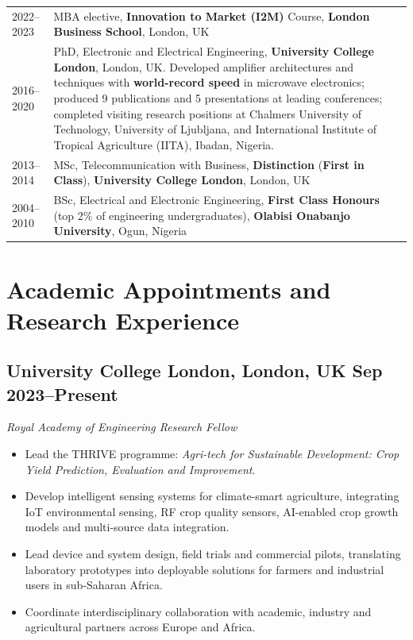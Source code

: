 \documentclass[a4paper,11pt]{article}
\newcommand{\cvitem}[2]{%
    \textsc{#1} & #2\\[2.5mm]
}
\newcommand{\role}[3]{%
    \subsection*{#1 \hfill \normalfont #2}
    \vspace{-0.5mm}
    {\itshape #3}
    \vspace{2mm}
}
\begin{document}
\begin{tabularx}{\textwidth}{>{\raggedleft\arraybackslash}p{2.4cm} X}

\cvitem{2022--2023}{
MBA elective, \textbf{Innovation to Market (I2M)} Course,
\textbf{London Business School}, London, UK
}

\cvitem{2016--2020}{
PhD, Electronic and Electrical Engineering,
\textbf{University College London}, London, UK.
Developed amplifier architectures and techniques with
\textbf{world-record speed} in microwave electronics; produced 9 publications
and 5 presentations at leading conferences; completed visiting research
positions at Chalmers University of Technology, University of Ljubljana,
and International Institute of Tropical Agriculture (IITA), Ibadan, Nigeria.
}

\cvitem{2013--2014}{
MSc, Telecommunication with Business,
\textbf{Distinction} (\textbf{First in Class}),
\textbf{University College London}, London, UK
}

\cvitem{2004--2010}{
BSc, Electrical and Electronic Engineering,
\textbf{First Class Honours} (top 2\% of engineering undergraduates),
\textbf{Olabisi Onabanjo University}, Ogun, Nigeria
}

\end{tabularx}


\section{Academic Appointments and Research Experience}

\role
{University College London, London, UK}
{Sep 2023--Present}
{Royal Academy of Engineering Research Fellow}

\begin{itemize}
    \item Lead the THRIVE programme: \emph{Agri-tech for Sustainable Development: Crop Yield Prediction, Evaluation and Improvement}.
    \item Develop intelligent sensing systems for climate-smart agriculture, integrating IoT environmental sensing, RF crop quality sensors, AI-enabled crop growth models and multi-source data integration.
    \item Lead device and system design, field trials and commercial pilots, translating laboratory prototypes into deployable solutions for farmers and industrial users in sub-Saharan Africa.
    \item Coordinate interdisciplinary collaboration with academic, industry and agricultural partners across Europe and Africa.
\end{itemize}
\end{document}

